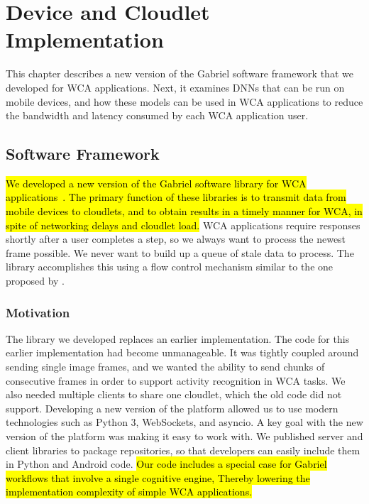 \chapter{Device and Cloudlet Implementation}\label{chap:implementation}

This chapter describes a new version of the Gabriel software framework that we
developed for WCA applications.
Next, it examines DNNs that can be run on mobile devices, and how
these models can be used in WCA applications to reduce the bandwidth and
latency consumed by each WCA application user.

\section{Software Framework}

\hl{
  We developed a new version of the Gabriel software library for WCA
  applications~{\cite{gabriel_github}}.
  The primary function of these libraries is to transmit data from mobile
  devices to cloudlets, and to obtain results in a timely manner for WCA, in
  spite of networking delays and cloudlet load.
}
WCA applications require responses shortly after a user completes a step, so
we always want to process the newest frame possible. We never want to build up
a queue of stale data to process. The library accomplishes this using a flow
control mechanism similar to the one proposed by \citet{ha2014}.

\subsection{Motivation}

The library we developed replaces an earlier implementation.
The code for this earlier implementation had become unmanageable.
It was tightly coupled around sending single image frames, and we
wanted the ability to send chunks of consecutive frames in order to support
activity recognition in WCA tasks.
We also needed multiple clients to share one cloudlet, which the old code did
not support.
Developing a new version of the platform allowed us to use modern technologies
such as Python 3, WebSockets, and asyncio.
A key goal with the new version of the platform was making it easy to work with.
We published server and client libraries to package repositories, so that
developers can easily include them in Python and Android code.
\hl{
Our code includes a special case for Gabriel workflows that involve a single
cognitive engine, Thereby lowering the implementation complexity of simple WCA
applications.
}

